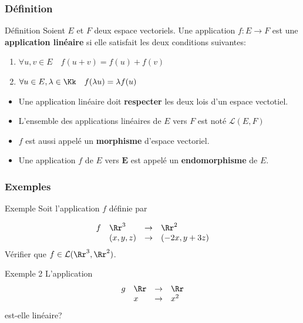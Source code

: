 \documentclass[dvipsnames]{beamer}
\begin{document}
\begin{frame}[<+->]
  \frametitle{Définition}
 \begin{block}{Définition}
   \small
   Soient $E$ et $F$ deux espace vectoriels. Une application $f: E\rightarrow F$
   est une \textbf{\alert{application linéaire}} si elle satisfait les deux
   conditions suivantes:

   \begin{enumerate}
     \item $\forall u, v \in E\quad f(u + v) = f(u) + f(v)$\\[6pt]
     \item $\forall u\in E, \lambda\in \Kk\quad f(\lambda u) = \lambda f(u)$
   \end{enumerate}
 \end{block} 

 \begin{itemize}
   \small
 \item  Une application linéaire doit \textbf{\alert{respecter}}  les deux lois
   d'un espace vectotiel.\\[4pt]
 \item L'ensemble des applications linéaires de $E$ vers $F$ est noté
   \alert{$\mathcal{L}(E,F)$}\\[4pt]
 \item $f$ est aussi appelé un \textbf{\alert{morphisme}} d'espace
   vectoriel.\\[4pt]
 \item Une application $f$ de $E$ vers $\mathbf{E}$ est appelé un
   \textbf{\alert{endomorphisme}} de $E$.
 \end{itemize}
\end{frame}
\begin{frame}[<+->]
  \frametitle{Exemples}
 \begin{block}{Exemple}
   \small
   Soit l'application $f$ définie par

   \begin{equation*}
     \begin{array}{llcl}
       f & \Rr^3 & \rightarrow & \Rr^2\\
         & (x,y,z)& \rightarrow & (-2x, y+ 3z)
    \end{array}
   \end{equation*}
   Vérifier que $f \in \mathcal{L}(\Rr^3, \Rr^2)$.
 \end{block} 
 \begin{block}{Exemple 2}
  L'application 
   \begin{equation*}
     \begin{array}{llcl}
       g & \Rr & \rightarrow & \Rr\\
         & x& \rightarrow & x^2 
    \end{array}
   \end{equation*}
   est-elle linéaire?
 \end{block}
\end{frame}
\end{document}
